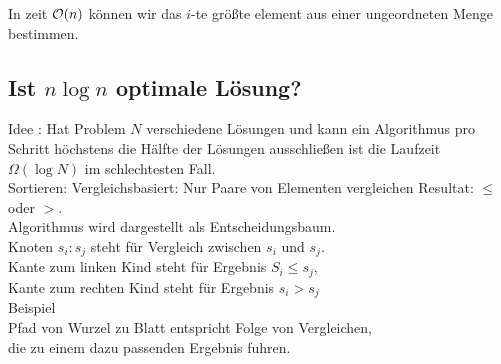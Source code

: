         \begin{satz}
            In zeit $\mathcal{O}(n)$ können wir das $i$-te größte element aus einer ungeordneten Menge bestimmen.
        \end{satz}
\subsection{Ist $n \log n$ optimale Lösung?}
Idee : Hat Problem $N$ verschiedene Lösungen und kann ein Algorithmus
pro Schritt höchstens die Hälfte der Lösungen ausschließen ist die Laufzeit 
$\Omega(\log N)$ im schlechtesten Fall.\\
Sortieren: Vergleichsbasiert: Nur Paare von Elementen vergleichen
Resultat: $\leq$ oder $>$.\\
Algorithmus wird dargestellt als Entscheidungsbaum.\\
Knoten $s_i:s_j$ steht für Vergleich zwischen $s_i$ und $s_j$.\\
Kante zum linken Kind steht für Ergebnis $S_i \leq s_j$,\\
Kante zum rechten Kind steht für Ergebnis $s_i > s_j$\\
Beispiel\\
Pfad von Wurzel zu Blatt entspricht Folge von Vergleichen,\\
die zu einem dazu passenden Ergebnis fuhren.\\

